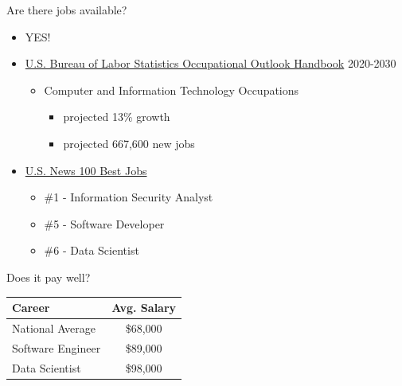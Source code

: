 \documentclass[aspectratio=169]{beamer}
\begin{document}
\begin{frame}{Are there jobs available?}
    \begin{itemize}[label=--]
        \item YES!
        \item \href{https://www.bls.gov/ooh/computer-and-information-technology/home.htm}{U.S. Bureau of Labor Statistics Occupational Outlook Handbook} 2020-2030
            \begin{itemize}[label=\(\blacktriangleright\)]
                \item Computer and Information Technology Occupations
                \begin{itemize}[label=--,itemsep=5pt]
                    \item projected 13\% growth
                    \item projected 667,600 new jobs
                \end{itemize}
            \end{itemize}
        \item \href{https://money.usnews.com/careers/best-jobs/rankings/the-100-best-jobs}{U.S. News 100 Best Jobs}
            \begin{itemize}[label=\(\blacktriangleright\),itemsep=5pt]
                \item \#1 - Information Security Analyst
                \item \#5 - Software Developer
                \item \#6 - Data Scientist
            \end{itemize}
    \end{itemize}
\end{frame}


\begin{frame}{Does it pay well?}
    \begin{table}
    \centering
        \begin{tabular}{lc}
            \toprule
            \textbf{Career}    & \textbf{Avg. Salary} \\
            \midrule
            National Average   & \$68,000             \\
            \midrule
            Software Engineer  & \$89,000             \\
            Data Scientist     & \$98,000             \\
            \bottomrule
        \end{tabular}
    \end{table}   
\end{frame}
\end{document}
